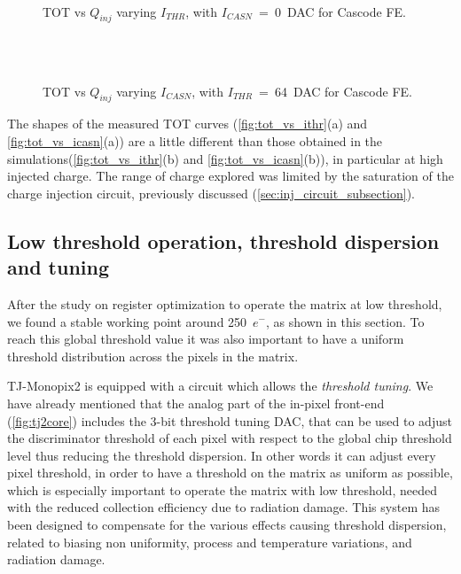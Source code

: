 \begin{figure}[h!]
\centering
{}\quad
{}\\
\caption{TOT vs $Q_{inj}$ varying $I_{THR}$, with $I_{CASN}$~=~\SI{0}{DAC} for Cascode FE.}
\label{fig:tot_vs_ithr}
\end{figure}

\begin{figure}[h!]
\centering
{}\\%
{}\\
\caption{TOT vs $Q_{inj}$ varying $I_{CASN}$, with $I_{THR}$~=~\SI{64}{DAC} for Cascode FE.}
\label{fig:tot_vs_icasn}
\end{figure}

The shapes of the measured TOT curves (\autoref{fig:tot_vs_ithr}(a) and \autoref{fig:tot_vs_icasn}(a)) are a little different than those obtained in the simulations(\autoref{fig:tot_vs_ithr}(b) and \autoref{fig:tot_vs_icasn}(b)), in particular at high injected charge. The range of charge explored was limited by the saturation of the charge injection circuit, previously discussed (\autoref{sec:inj_circuit_subsection}).

\newpage

\subsection{Low threshold operation, threshold dispersion and tuning} \label{sec:tuning}

After the study on register optimization to operate the matrix at low threshold, we found a stable working point around 250~$e^{-}$, as shown in this section. To reach this global threshold value it was also important to have a uniform threshold distribution across the pixels in the matrix. 

TJ-Monopix2 is equipped with a circuit which allows the \textit{threshold tuning}. We have already mentioned that the analog part of the in-pixel front-end (\autoref{fig:tj2core}) includes the 3-bit threshold tuning DAC, that can be used to adjust the discriminator threshold of each pixel with respect to the global chip threshold level thus reducing the threshold dispersion. In other words it can adjust every pixel threshold, in order to have a threshold on the matrix as uniform as possible, which is especially important to operate the matrix with low threshold, needed with the reduced collection efficiency due to radiation damage.  This system has been designed to compensate for the various effects causing threshold dispersion, related to biasing non uniformity, process and temperature variations, and radiation damage. \\

